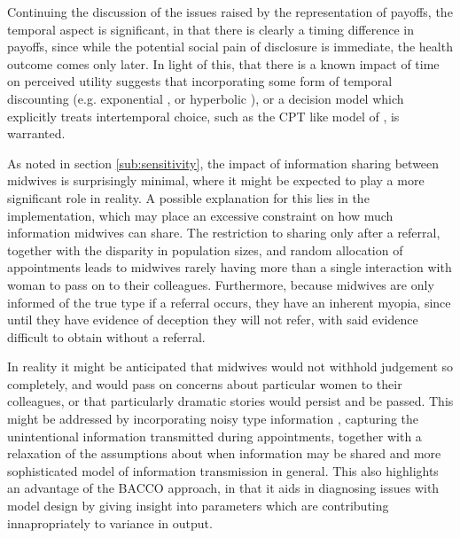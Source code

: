 Continuing the discussion of the issues raised by the representation of payoffs, the temporal aspect is significant, in that there is clearly a timing difference in payoffs, since while the potential social pain of disclosure is immediate, the health outcome comes only later. In light of this, that there is a known impact of time on perceived utility \citet{Thaler1981} suggests that incorporating some form of temporal discounting (e.g. exponential \citep{Samuelson1937}, or hyperbolic \citep{Ainslie1991}), or a decision model which explicitly treats intertemporal choice, such as the \ac{CPT} like model of \citet{Loewenstein1992}, is warranted. 

As noted in section \ref{sub:sensitivity}, the impact of information sharing between midwives is surprisingly minimal, where it might be expected to play a more significant role in reality. A possible explanation for this lies in the implementation, which may place an excessive constraint on how much information midwives can share. The restriction to sharing only after a referral, together with the disparity in population sizes, and random allocation of appointments leads to midwives rarely having more than a single interaction with woman to pass on to their colleagues. Furthermore, because midwives are only informed of the true type if a referral occurs, they have an inherent myopia, since until they have evidence of deception they will not refer, with said evidence difficult to obtain without a referral.

In reality it might be anticipated that midwives would not withhold judgement so completely, and would pass on concerns about particular women to their colleagues, or that particularly dramatic stories would persist and be passed. This might be addressed by incorporating noisy type information \citep{Feltovich2002}, capturing the unintentional information transmitted during appointments, together with a relaxation of the assumptions about when information may be shared and more sophisticated model of information transmission in general. This also highlights an advantage of the \ac{BACCO} approach, in that it aids in diagnosing issues with model design by giving insight into parameters which are contributing innapropriately to variance in output.

